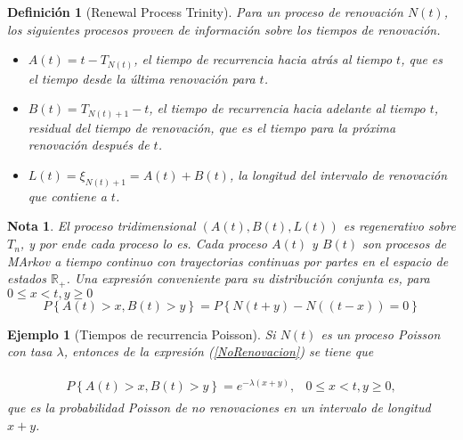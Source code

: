 \documentclass{article}
\newtheorem{Def}{Definición}[section]
\newtheorem{Ejem}{Ejemplo}[section]
\newtheorem{Note}{Nota}[section]
\newcommand{\rea}{\mathbb{R}}
\numberwithin{equation}{section}
\begin{document}
\begin{Def}[Renewal Process Trinity]
Para un proceso de renovaci\'on $N\left(t\right)$, los siguientes procesos proveen de informaci\'on sobre los tiempos de renovaci\'on.
\begin{itemize}
\item $A\left(t\right)=t-T_{N\left(t\right)}$, el tiempo de recurrencia hacia atr\'as al tiempo $t$, que es el tiempo desde la \'ultima renovaci\'on para $t$.

\item $B\left(t\right)=T_{N\left(t\right)+1}-t$, el tiempo de recurrencia hacia adelante al tiempo $t$, residual del tiempo de renovaci\'on, que es el tiempo para la pr\'oxima renovaci\'on despu\'es de $t$.

\item $L\left(t\right)=\xi_{N\left(t\right)+1}=A\left(t\right)+B\left(t\right)$, la longitud del intervalo de renovaci\'on que contiene a $t$.
\end{itemize}
\end{Def}

\begin{Note}
El proceso tridimensional $\left(A\left(t\right),B\left(t\right),L\left(t\right)\right)$ es regenerativo sobre $T_{n}$, y por ende cada proceso lo es. Cada proceso $A\left(t\right)$ y $B\left(t\right)$ son procesos de MArkov a tiempo continuo con trayectorias continuas por partes en el espacio de estados $\rea_{+}$. Una expresi\'on conveniente para su distribuci\'on conjunta es, para $0\leq x<t,y\geq0$
\begin{equation}\label{NoRenovacion}
P\left\{A\left(t\right)>x,B\left(t\right)>y\right\}=
P\left\{N\left(t+y\right)-N\left((t-x)\right)=0\right\}
\end{equation}
\end{Note}

\begin{Ejem}[Tiempos de recurrencia Poisson]
Si $N\left(t\right)$ es un proceso Poisson con tasa $\lambda$, entonces de la expresi\'on (\ref{NoRenovacion}) se tiene que

\begin{eqnarray*}
\begin{array}{lc}
P\left\{A\left(t\right)>x,B\left(t\right)>y\right\}=e^{-\lambda\left(x+y\right)},&0\leq x<t,y\geq0,
\end{array}
\end{eqnarray*}
que es la probabilidad Poisson de no renovaciones en un intervalo de longitud $x+y$.

\end{Ejem}
\end{document}
